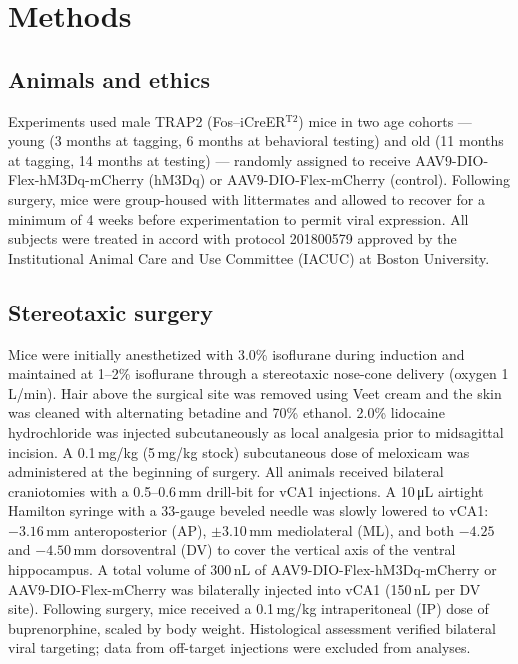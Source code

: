 \documentclass[11pt]{article}
\begin{document}
\section{Methods}

\subsection{Animals and ethics}
Experiments used male TRAP2 (Fos--iCreER$^{\mathrm{T2}}$) mice in two age cohorts --- young (3 months at tagging, 6 months at behavioral testing) and old (11 months at tagging, 14 months at testing) --- randomly assigned to receive AAV9-DIO-Flex-hM3Dq-mCherry (hM3Dq) or AAV9-DIO-Flex-mCherry (control). Following surgery, mice were group-housed with littermates and allowed to recover for a minimum of 4 weeks before experimentation to permit viral expression. All subjects were treated in accord with protocol 201800579 approved by the Institutional Animal Care and Use Committee (IACUC) at Boston University.

\subsection{Stereotaxic surgery}
Mice were initially anesthetized with 3.0\% isoflurane during induction and maintained at 1--2\% isoflurane through a stereotaxic nose-cone delivery (oxygen 1\,L/min). Hair above the surgical site was removed using Veet cream and the skin was cleaned with alternating betadine and 70\% ethanol. 2.0\% lidocaine hydrochloride was injected subcutaneously as local analgesia prior to midsagittal incision. A 0.1\,mg/kg (5\,mg/kg stock) subcutaneous dose of meloxicam was administered at the beginning of surgery. All animals received bilateral craniotomies with a 0.5--0.6\,mm drill-bit for vCA1 injections. A 10\,\si{\micro\liter} airtight Hamilton syringe with a 33-gauge beveled needle was slowly lowered to vCA1: $-3.16$\,mm anteroposterior (AP), $\pm 3.10$\,mm mediolateral (ML), and both $-4.25$ and $-4.50$\,mm dorsoventral (DV) to cover the vertical axis of the ventral hippocampus. A total volume of 300\,nL of AAV9-DIO-Flex-hM3Dq-mCherry or AAV9-DIO-Flex-mCherry was bilaterally injected into vCA1 (150\,nL per DV site). Following surgery, mice received a 0.1\,mg/kg intraperitoneal (IP) dose of buprenorphine, scaled by body weight. Histological assessment verified bilateral viral targeting; data from off-target injections were excluded from analyses.
\end{document}
